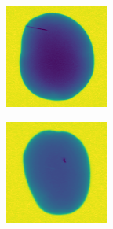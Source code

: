 \documentclass[11pt]{article}
\begin{document}
\begin{figure}[!h]
\begin{subfigure}[b]{0.22\textwidth}
         \caption{}
         \label{fig:metal_1}
     \end{subfigure}
     \hfill
     \begin{subfigure}[b]{0.22\textwidth}
         \centering
         \includegraphics[width=\textwidth]{figurer/potato_dataset/metal/metal_2.jpg}
         \caption{}
         \label{fig:metal_2}
     \end{subfigure}
     \hfill
     \begin{subfigure}[b]{0.22\textwidth}
         \centering
         \includegraphics[width=\textwidth]{figurer/potato_dataset/metal/metal_3.jpg}

\end{subfigure}
\end{figure}
\end{document}

